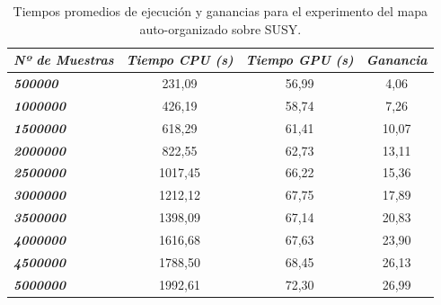 \begin{table}[ht]
\begin{tabular}{@{}l|c|c|c@{}}
\textit{\textbf{Nº de Muestras}} & \multicolumn{1}{l|}{\textit{\textbf{Tiempo CPU (s)}}} & \multicolumn{1}{l|}{\textit{\textbf{Tiempo GPU (s)}}} & \multicolumn{1}{l}{\textit{\textbf{Ganancia}}} \\ \midrule
\textit{\textbf{500000}}         & 231,09                                                & 56,99                                               & 4,06                                          \\
\textit{\textbf{1000000}}        & 426,19                                                & 58,74                                               & 7,26                                           \\
\textit{\textbf{1500000}}        & 618,29                                                & 61,41                                               & 10,07                                           \\
\textit{\textbf{2000000}}        & 822,55                                                & 62,73                                               & 13,11                                           \\
\textit{\textbf{2500000}}        & 1017,45                                               & 66,22                                               & 15,36                                           \\
\textit{\textbf{3000000}}        & 1212,12                                               & 67,75                                               & 17,89                                           \\
\textit{\textbf{3500000}}        & 1398,09                                               & 67,14                                               & 20,83                                           \\
\textit{\textbf{4000000}}        & 1616,68                                               & 67,63                                               & 23,90                                           \\
\textit{\textbf{4500000}}        & 1788,50                                               & 68,45                                               & 26,13                                           \\
\textit{\textbf{5000000}}        & 1992,61                                               & 72,30                                               & 26,99                                          
\end{tabular}
\caption{Tiempos promedios de ejecución y ganancias para el experimento del mapa auto-organizado sobre SUSY.}
\label{tab:susysom}
\end{table}

